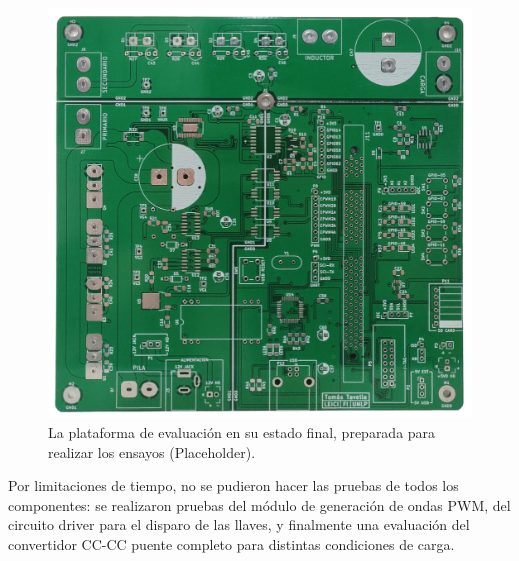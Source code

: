 \begin{figure}[h]
    \centering
    \includegraphics[scale=0.13]{Imagenes/Placa Fisica.jpg}
    \caption{La plataforma de evaluación en su estado final, preparada para realizar los ensayos {\Bold (Placeholder)}.}
    \label{plataforma_completa}
\end{figure}

Por limitaciones de tiempo, no se pudieron hacer las pruebas de todos los componentes: se realizaron pruebas del módulo de generación de ondas PWM, del circuito driver para el disparo de las llaves, y finalmente una evaluación del convertidor CC-CC puente completo para distintas condiciones de carga.\\



\newpage



\afterpage{\blankpage}\newpage